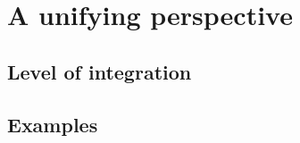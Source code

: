 \documentclass[presentation]{beamer} %
\begin{document}
\section{A unifying perspective}
\subsection{Level of integration}
\subsection{Examples}



\section*{\refname}
\begin{frame}[allowframebreaks]
  \frametitle{\refname}
  \scriptsize
  
  
\end{frame}
\section*{\refname}
\end{document}
